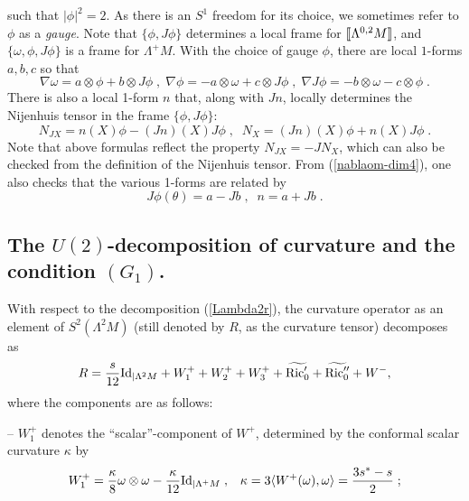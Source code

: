 \documentclass{amsart}
\newcommand{\La}{\Lambda}
\newcommand{\leftr}{[\hbox{\hspace{-0.15em}}[}
\newcommand{\rightr}{]\hbox{\hspace{-0.15em}}]}
\begin{document}
such that $| \phi |^2 = 2$. As there is an $S^1$ freedom for its choice, we sometimes refer to $\phi$ as a {\it gauge}. Note that $\{ \phi, J\phi \}$ determines a local frame for $\leftr \La^{0,2}M \rightr$, and $\{\omega, \phi, J\phi \}$ is a frame for $\Lambda^+M$. With the choice of gauge $\phi$, there are local $1$-forms $a, b, c$ so that
\begin{equation} \label{abc}
\nabla \omega = a \otimes \phi + b \otimes J\phi \; , \; \nabla \phi = - a \otimes \omega  + c \otimes J\phi \; , \;
\nabla J\phi = - b\otimes \omega - c \otimes \phi \; .
\end{equation}
There is also a local 1-form $n$ that, along with $Jn$, locally determines the Nijenhuis tensor in the frame $\{ \phi, J\phi \}$:
\begin{equation} \label{NphiJphi}
    N_{JX} = n(X) \phi - (Jn)(X) J\phi \; , \; \; N_X = (Jn)(X) \phi + n(X) J \phi \; .
\end{equation}
\noindent 
Note that above formulas reflect the property $N_{JX} = -JN_X$, which can also be checked from the definition of the Nijenhuis tensor.
From (\ref{nablaom-dim4}), one also checks that the various 1-forms are related by
\begin{equation} \label{ab-thetan}
  J\phi( \theta) = a - Jb \; , \; \; n = a+ J b \; .
\end{equation}



\subsection{The $U(2)$-decomposition of curvature and the condition $(G_1)$.} With respect to the decomposition (\ref{Lambda2r}), the curvature operator as an element of $S^2(\Lambda^2 M)$ (still denoted by $R$, as the curvature tensor) decomposes as \cite{TV}
\begin{equation}\label{u(2)}
R = \frac{s}{12} {\rm Id}_{| \La^2M} + W_1 ^+ + W_2 ^+ + W_3 ^+
 + {\widetilde{{\rm Ric}'_0}}
 + {\widetilde {{\rm Ric}''_0}} + W^- ,
\end{equation}
where the components are as follows:

-- $W^+_1$ denotes the ``scalar''-component of $W^+$, determined by the conformal scalar curvature $\kappa$ by
\begin{equation}\label{w^+1}
W_1^+ = \frac{\kappa}{8} \omega \otimes \omega - \frac{\kappa}{12} {\rm
Id}_{| \La^+M} \; , \; \; \;  \kappa = 3 \langle W^+(\omega), \omega \rangle = \frac{3s^* - s}{2} \; ;
\end{equation}
\end{document}
